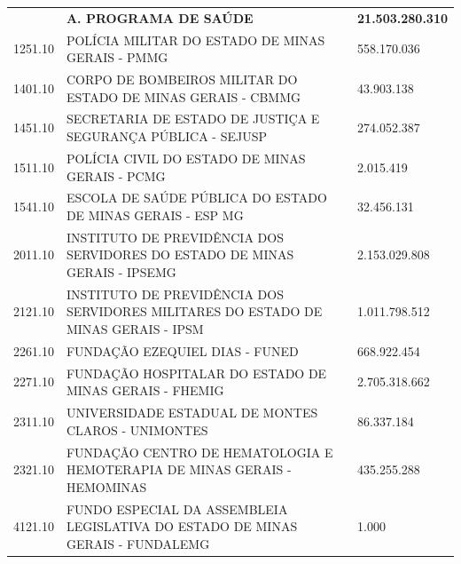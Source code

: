 \documentclass{article}
\begin{document}
\begin{longtable}[c]{m{3cm}|m{12cm}|m{3cm}}
\multicolumn{1}{C{3cm}|}{ \textbf{}} & \multicolumn{1}{L{12cm}|}{ \textbf{A. PROGRAMA DE SAÚDE}} & \multicolumn{1}{R{3cm}}{ \textbf{21.503.280.310}} \\
\multicolumn{1}{C{3cm}|}{1251.10} & \multicolumn{1}{L{12cm}|}{POLÍCIA MILITAR DO ESTADO DE MINAS GERAIS - PMMG} & \multicolumn{1}{R{3cm}}{558.170.036} \\
\multicolumn{1}{C{3cm}|}{1401.10} & \multicolumn{1}{L{12cm}|}{CORPO DE BOMBEIROS MILITAR DO ESTADO DE MINAS GERAIS - CBMMG} & \multicolumn{1}{R{3cm}}{43.903.138} \\
\multicolumn{1}{C{3cm}|}{1451.10} & \multicolumn{1}{L{12cm}|}{SECRETARIA DE ESTADO DE JUSTIÇA E SEGURANÇA PÚBLICA - SEJUSP} & \multicolumn{1}{R{3cm}}{274.052.387} \\
\multicolumn{1}{C{3cm}|}{1511.10} & \multicolumn{1}{L{12cm}|}{POLÍCIA CIVIL DO ESTADO DE MINAS GERAIS - PCMG} & \multicolumn{1}{R{3cm}}{2.015.419} \\
\multicolumn{1}{C{3cm}|}{1541.10} & \multicolumn{1}{L{12cm}|}{ESCOLA DE SAÚDE PÚBLICA DO ESTADO DE MINAS GERAIS - ESP MG} & \multicolumn{1}{R{3cm}}{32.456.131} \\
\multicolumn{1}{C{3cm}|}{2011.10} & \multicolumn{1}{L{12cm}|}{INSTITUTO DE PREVIDÊNCIA DOS SERVIDORES DO ESTADO DE MINAS GERAIS - IPSEMG} & \multicolumn{1}{R{3cm}}{2.153.029.808} \\
\multicolumn{1}{C{3cm}|}{2121.10} & \multicolumn{1}{L{12cm}|}{INSTITUTO DE PREVIDÊNCIA DOS SERVIDORES MILITARES DO ESTADO DE MINAS GERAIS - IPSM} & \multicolumn{1}{R{3cm}}{1.011.798.512} \\
\multicolumn{1}{C{3cm}|}{2261.10} & \multicolumn{1}{L{12cm}|}{FUNDAÇÃO EZEQUIEL DIAS - FUNED} & \multicolumn{1}{R{3cm}}{668.922.454} \\
\multicolumn{1}{C{3cm}|}{2271.10} & \multicolumn{1}{L{12cm}|}{FUNDAÇÃO HOSPITALAR DO ESTADO DE MINAS GERAIS - FHEMIG} & \multicolumn{1}{R{3cm}}{2.705.318.662} \\
\multicolumn{1}{C{3cm}|}{2311.10} & \multicolumn{1}{L{12cm}|}{UNIVERSIDADE ESTADUAL DE MONTES CLAROS - UNIMONTES} & \multicolumn{1}{R{3cm}}{86.337.184} \\
\multicolumn{1}{C{3cm}|}{2321.10} & \multicolumn{1}{L{12cm}|}{FUNDAÇÃO CENTRO DE HEMATOLOGIA E HEMOTERAPIA DE MINAS GERAIS - HEMOMINAS} & \multicolumn{1}{R{3cm}}{435.255.288} \\
\multicolumn{1}{C{3cm}|}{4121.10} & \multicolumn{1}{L{12cm}|}{FUNDO ESPECIAL DA ASSEMBLEIA LEGISLATIVA DO ESTADO DE MINAS GERAIS - FUNDALEMG} & \multicolumn{1}{R{3cm}}{1.000} \\

\end{longtable}
\end{document}

